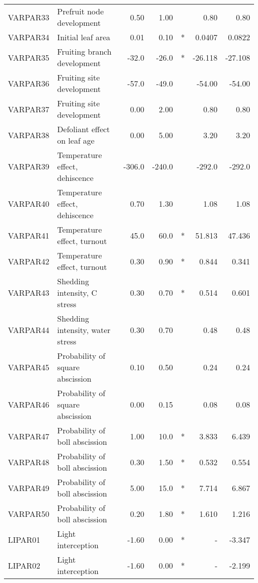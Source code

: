 \begin{longtable}{llrrcrr}
    VARPAR33 & Prefruit node development        & 0.50   & 1.00   &     & 0.80    & 0.80    \\
    VARPAR34 & Initial leaf area                & 0.01   & 0.10   & *   & 0.0407  & 0.0822  \\
    VARPAR35 & Fruiting branch development      & -32.0  & -26.0  & *   & -26.118 & -27.108 \\
    VARPAR36 & Fruiting site development        & -57.0  & -49.0  &     & -54.00  & -54.00  \\
    VARPAR37 & Fruiting site development        & 0.00   & 2.00   &     & 0.80    & 0.80    \\
    VARPAR38 & Defoliant effect on leaf age     & 0.00   & 5.00   &     & 3.20    & 3.20    \\
    VARPAR39 & Temperature effect, dehiscence   & -306.0 & -240.0 &     & -292.0  & -292.0  \\
    VARPAR40 & Temperature effect, dehiscence   & 0.70   & 1.30   &     & 1.08    & 1.08    \\
    VARPAR41 & Temperature effect, turnout      & 45.0   & 60.0   & *   & 51.813  & 47.436  \\
    VARPAR42 & Temperature effect, turnout      & 0.30   & 0.90   & *   & 0.844   & 0.341   \\
    VARPAR43 & Shedding intensity, C stress     & 0.30   & 0.70   & *   & 0.514   & 0.601   \\
    VARPAR44 & Shedding intensity, water stress & 0.30   & 0.70   &     & 0.48    & 0.48    \\
    VARPAR45 & Probability of square abscission & 0.10   & 0.50   &     & 0.24    & 0.24    \\
    VARPAR46 & Probability of square abscission & 0.00   & 0.15   &     & 0.08    & 0.08    \\
    VARPAR47 & Probability of boll abscission   & 1.00   & 10.0   & *   & 3.833   & 6.439   \\
    VARPAR48 & Probability of boll abscission   & 0.30   & 1.50   & *   & 0.532   & 0.554   \\
    VARPAR49 & Probability of boll abscission   & 5.00   & 15.0   & *   & 7.714   & 6.867   \\
    VARPAR50 & Probability of boll abscission   & 0.20   & 1.80   & *   & 1.610   & 1.216   \\
    LIPAR01  & Light interception               & -1.60  & 0.00   & *   & -       & -3.347  \\
    LIPAR02  & Light interception               & -1.60  & 0.00   & *   & -       & -2.199  \\

\end{longtable}
